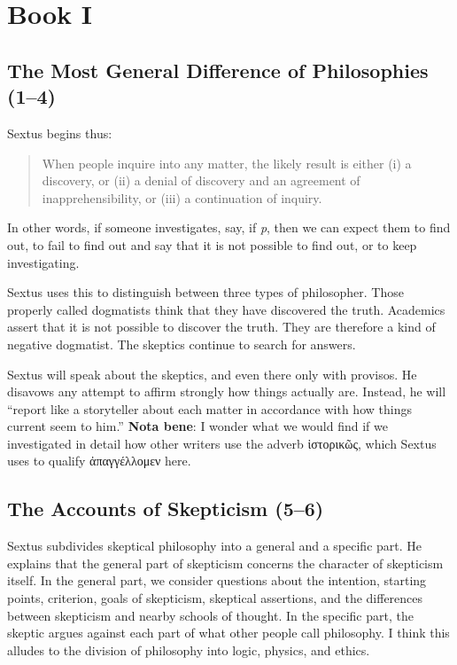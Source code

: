 \chapter{Book I}

\section*{The Most General Difference of Philosophies (1--4)}


Sextus begins thus:

\begin{quote}
    When people inquire into any matter, the likely result is either (i) a discovery, or (ii) a denial of discovery and an agreement of inapprehensibility, or (iii) a continuation of inquiry.
\end{quote}

In other words, if someone investigates, say, if \textit{p}, then we can expect them to find out, to fail to find out and say that it is not possible to find out, or to keep investigating.

Sextus uses this to distinguish between three types of philosopher. Those properly called dogmatists think that they have discovered the truth. Academics assert that it is not possible to discover the truth. They are therefore a kind of negative dogmatist. The skeptics continue to search for answers.

Sextus will speak about the skeptics, and even there only with provisos. He disavows any attempt to affirm strongly how things actually are. Instead, he will ``report like a storyteller about each matter in accordance with how things current seem to him.'' \textbf{Nota bene}: I wonder what we would find if we investigated in detail how other writers use the adverb \textgreek{ἱστορικῶς}, which Sextus uses to qualify \textgreek{ἀπαγγέλλομεν} here.

\section*{The Accounts of Skepticism (5--6)}


Sextus subdivides skeptical philosophy into a general and a specific part. He explains that the general part of skepticism concerns the character of skepticism itself. In the general part, we consider questions about the intention, starting points, criterion, goals of skepticism, skeptical assertions, and the differences between skepticism and nearby schools of thought. In the specific part, the skeptic argues against each part of what other people call philosophy. I think this alludes to the division of philosophy into logic, physics, and ethics.


